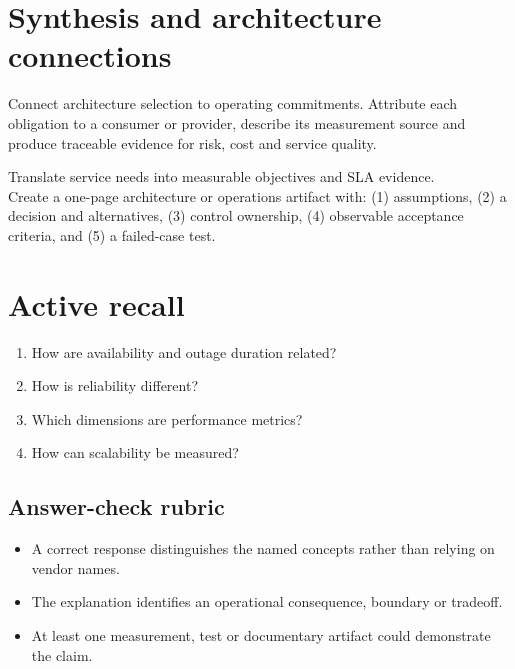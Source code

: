 \documentclass[10pt,letterpaper]{article}
\begin{document}
\section{Synthesis and architecture connections}
Connect architecture selection to operating commitments. Attribute each obligation to a consumer or provider, describe its measurement source and produce traceable evidence for risk, cost and service quality.
\begin{workbox}[title={Applied deliverable}]
Translate service needs into measurable objectives and SLA evidence.\\[4pt]Create a one-page architecture or operations artifact with: (1) assumptions, (2) a decision and alternatives, (3) control ownership, (4) observable acceptance criteria, and (5) a failed-case test.
\end{workbox}
\section{Active recall}
\begin{enumerate}
\item How are availability and outage duration related?
\item How is reliability different?
\item Which dimensions are performance metrics?
\item How can scalability be measured?
\end{enumerate}
\subsection{Answer-check rubric}
\begin{itemize}
\item A correct response distinguishes the named concepts rather than relying on vendor names.
\item The explanation identifies an operational consequence, boundary or tradeoff.
\item At least one measurement, test or documentary artifact could demonstrate the claim.
\end{itemize}
\end{document}
